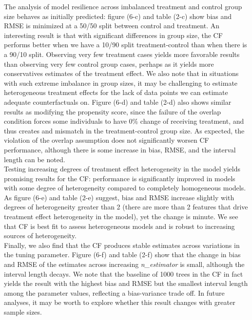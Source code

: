 \documentclass[12pt]{article}
\begin{document}
The analysis of model resilience across imbalanced treatment and control group size behaves as initially predicted: figure (6-c) and table (2-c) show bias and RMSE is minimized at a 50/50 split between control and treatment. An interesting result is that with significant differences in group size, the CF performs better when we have a 10/90 split treatment-control than when there is a 90/10 split. Observing very few treatment cases yields more favorable results than observing very few control group cases, perhaps as it yields more conservatives estimates of the treatment effect. We also note that in situations with such extreme imbalance in group sizes, it may be challenging to estimate heterogeneous treatment effects for the lack of data points we can estimate adequate counterfactuals on. Figure (6-d) and table (2-d) also shows similar results as modifying the propensity score, since the failure of the overlap condition forces some individuals to have 0\% change of receiving treatment, and thus creates and mismatch in the treatment-control group size. As expected, the violation of the overlap assumption does not significantly worsen CF performance, although there is some increase in bias, RMSE, and the interval length can be noted. \\ 

Testing increasing degrees of treatment effect heterogeneity in the model yields promising results for the CF:  performance is significantly improved in models with some degree of heterogeneity compared to completely homogeneous models. As figure (6-e) and table (2-e) suggest, bias and RMSE increase slightly with degrees of heterogeneity greater than 2 (there are more than 2 features that drive treatment effect heterogeneity in the model), yet the change is minute. We see that CF is best fit to assess heterogeneous models and is robust to increasing sources of heterogeneity. \\ 

Finally, we also find that the CF produces stable estimates across variations in the tuning parameter. Figure (6-f) and table (2-f) show that the change in bias and RMSE of the estimates across increasing \textit{n\_estimator} is small, although the interval length decays. We note that the baseline of 1000 trees in the CF in fact yields the result with the highest bias and RMSE but the smallest interval length among the parameter values, reflecting a bias-variance trade off. In future analyses, it may be worth to explore whether this result changes with greater sample sizes. \\
\end{document}
